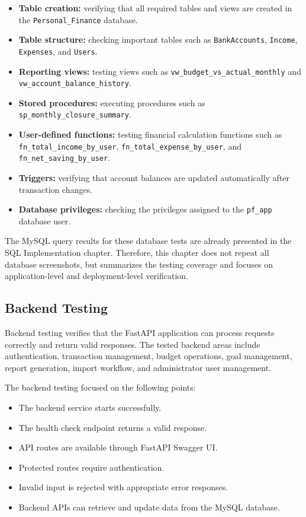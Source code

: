 ﻿\documentclass{article}
\begin{document}
\begin{itemize}
    \item \textbf{Table creation:} verifying that all required tables and views are created in the \texttt{Personal\_Finance} database.
    \item \textbf{Table structure:} checking important tables such as \texttt{BankAccounts}, \texttt{Income}, \texttt{Expenses}, and \texttt{Users}.
    \item \textbf{Reporting views:} testing views such as \texttt{vw\_budget\_vs\_actual\_monthly} and \texttt{vw\_account\_balance\_history}.
    \item \textbf{Stored procedures:} executing procedures such as \texttt{sp\_monthly\_closure\_summary}.
    \item \textbf{User-defined functions:} testing financial calculation functions such as \texttt{fn\_total\_income\_by\_user}, \texttt{fn\_total\_expense\_by\_user}, and \texttt{fn\_net\_saving\_by\_user}.
    \item \textbf{Triggers:} verifying that account balances are updated automatically after transaction changes.
    \item \textbf{Database privileges:} checking the privileges assigned to the \texttt{pf\_app} database user.
\end{itemize}

The MySQL query results for these database tests are already presented in the SQL Implementation chapter. Therefore, this chapter does not repeat all database screenshots, but summarizes the testing coverage and focuses on application-level and deployment-level verification.

\subsection{Backend Testing}

Backend testing verifies that the FastAPI application can process requests correctly and return valid responses. The tested backend areas include authentication, transaction management, budget operations, goal management, report generation, import workflow, and administrator user management.

The backend testing focused on the following points:

\begin{itemize}
    \item The backend service starts successfully.
    \item The health check endpoint returns a valid response.
    \item API routes are available through FastAPI Swagger UI.
    \item Protected routes require authentication.
    \item Invalid input is rejected with appropriate error responses.
    \item Backend APIs can retrieve and update data from the MySQL database.
\end{itemize}
\end{document}
